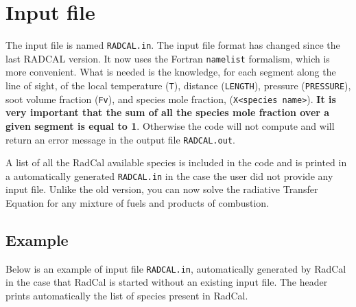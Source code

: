 \section{Input file}

The input file is named \verb=RADCAL.in=. The input file format has changed since the last RADCAL version. It now uses the Fortran \verb=namelist= formalism, which is more convenient. What is needed is the knowledge, for each segment along the line of sight, of the local temperature (\verb=T=), distance (\verb=LENGTH=), pressure (\verb=PRESSURE=), soot volume fraction (\verb=Fv=), and species mole fraction, (\verb=X<species name>=).
\textbf{It is very important that the sum of all the species mole fraction over a given segment is equal to 1}. Otherwise the code will not compute and will return an error message in the output file \verb=RADCAL.out=.

A list of all the RadCal available species is included in the code and is printed in a automatically generated \verb=RADCAL.in= in the case the user did not provide any input file. Unlike the old version, you can now solve the radiative Transfer Equation for any mixture of fuels and products of combustion.

\subsection{Example}\label{sec:input_file}
Below is an example of input file \verb=RADCAL.in=, automatically generated by RadCal in the case that RadCal is started without an existing input file. The header prints automatically the list of species present in RadCal.

